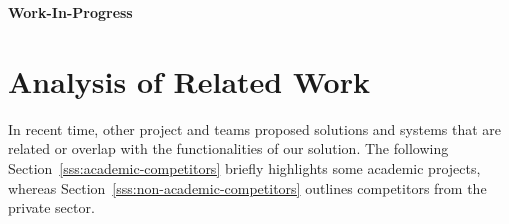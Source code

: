 \documentclass{llncs}
\begin{document}
{			\textbf{Work-In-Progress}		
			

					
		
%
%			
					


	\section{Analysis of Related Work}
		\label{s:section-7}	
		

		
%							
		
		
			
		In recent time, other project and teams proposed solutions and systems that are related or overlap with the functionalities of our solution. The following Section~\ref{sss:academic-competitors} briefly highlights some academic projects, whereas Section~\ref{sss:non-academic-competitors} outlines competitors from the private sector.

}
\end{document}
